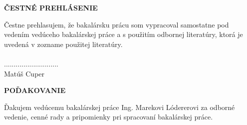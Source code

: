 \documentclass[a4paper,slovak,12pt,appendix]{article}
\begin{document}
\begin{titlepage}
\vspace*{15cm}
\begin{large}
  \noindent \textbf{ČESTNÉ PREHLÁSENIE} \par
\end{large}
\vspace*{0.5cm}
\noindent
Čestne prehlasujem, že bakalársku prácu som vypracoval samostatne pod vedením
vedúceho bakalárskej práce a s použitím odbornej literatúry, ktorá je uvedená
v zozname použitej literatúry. \\
\vspace*{0.5cm}\\
\hspace*{10cm}............................\\
\hspace*{10.7cm} Matúš Cuper
\end{titlepage}

\begin{titlepage}
\vspace*{15cm}
\begin{large}
  \noindent \textbf{POĎAKOVANIE} \par
\end{large}
\vspace*{0.5cm}
\noindent
Ďakujem vedúcemu bakalárskej práce Ing. Marekovi Lódererovi za odborné vedenie,
cenné rady a pripomienky pri spracovaní bakalárskej práce.
\end{titlepage}


\newpage
\tableofcontents
\thispagestyle{empty}                                                           %

\newpage
\listoffigures
\thispagestyle{empty}

\newpage
\listoftables
\thispagestyle{empty}


\newpage
\setcounter{page}{1}
\end{document}
